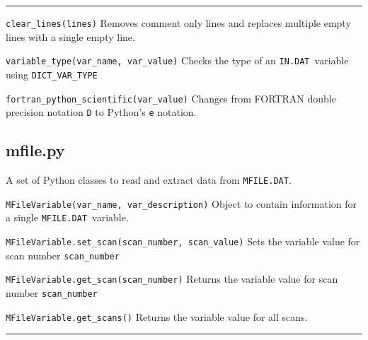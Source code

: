 \documentclass[11pt,a4paper]{report}
\newcommand{\indat}{\mbox{\texttt{IN.DAT}}}
\newcommand{\mfile}{\mbox{\texttt{MFILE.DAT}}}
\begin{document}
\rule{\textwidth}{0.4pt}

\begin{description}

\item{\verb|clear_lines(lines)|} Removes comment only lines and replaces
  multiple empty lines with a single empty line.

\item{\verb|variable_type(var_name, var_value)|} Checks the type of an \indat\
  variable using \verb|DICT_VAR_TYPE|

\item{\verb|fortran_python_scientific(var_value)|} Changes from FORTRAN double
  precision notation \verb|D| to Python's \verb|e| notation.

\end{description}

\subsection{mfile.py}

A set of Python classes to read and extract data from \mfile.

\begin{description}

\item{\verb|MFileVariable(var_name, var_description)|} Object to contain
  information for a single \mfile\ variable.

\item{\verb|MFileVariable.set_scan(scan_number, scan_value)|} Sets the
  variable value for scan number \verb|scan_number|

\item{\verb|MFileVariable.get_scan(scan_number)|} Returns the variable value
  for scan number \verb|scan_number|

\item{\verb|MFileVariable.get_scans()|} Returns the variable value for all
  scans.

\end{description}

\rule{\textwidth}{0.4pt}
\end{document}
